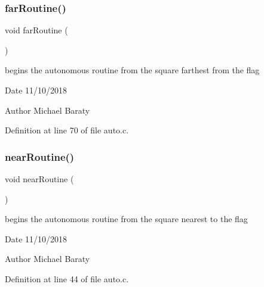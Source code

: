 \subsubsection{far\+Routine()}
{\footnotesize\ttfamily void far\+Routine (\begin{DoxyParamCaption}{ }\end{DoxyParamCaption})}



begins the autonomous routine from the square farthest from the flag 

\begin{DoxyDate}{Date}
11/10/2018 
\end{DoxyDate}
\begin{DoxyAuthor}{Author}
Michael Baraty 
\end{DoxyAuthor}


Definition at line 70 of file auto.\+c.

\mbox{\label{auton_8h_a91e751e72f029bd76a19bb6e40d570ce}} 
\subsubsection{near\+Routine()}
{\footnotesize\ttfamily void near\+Routine (\begin{DoxyParamCaption}{ }\end{DoxyParamCaption})}



begins the autonomous routine from the square nearest to the flag 

\begin{DoxyDate}{Date}
11/10/2018 
\end{DoxyDate}
\begin{DoxyAuthor}{Author}
Michael Baraty 
\end{DoxyAuthor}


Definition at line 44 of file auto.\+c.

